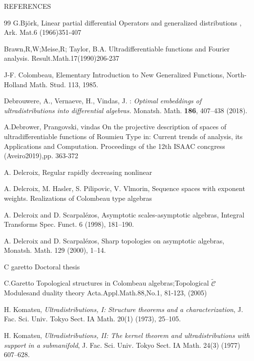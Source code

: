 \documentclass[12pt,a4paper]{amsart}
\begin{document}
REFERENCES %
\begin{thebibliography}{99}
 G.Bj\"{o}rk, Linear partial differential Operators and generalized distributions , Ark. Mat.6 (1966)351-407 
  
  
  
  
  
Brawn,R,W;Meise,R; Taylor, B.A.
Ultradifferentiable functions and Fourier analysis.
Result.Math.17(1990)206-237

J-F. Colombeau,
 Elementary Introduction to New Generalized Functions,
North-Holland Math. Stud. 113, 1985.

Debrouwere, A., Vernaeve, H., Vindas, J. :
\emph{Optimal embeddings of ultradistributions into differential algebras.}
Monatsh.  Math.  \textbf{186}, 407–438 (2018).

A.Debrower, Prangovski, vindas
On the projective description of spaces of ultradifferentiable functions of Roumieu Type in:
Current trends of analysis, its Applications and Computation. Proceedings of the 12th ISAAC concgress (Aveiro2019),pp. 363-372

 A. Delcroix, Regular rapidly decreasing nonlinear %


 A. Delcroix, M. Hasler,  S. Pilipovic, V. Vlmorin, Sequence spaces with exponent weights. Realizations of Colombeau type algebras

 A. Delcroix and D. Scarpal\'ezos, Asymptotic scales-asymptotic algebras, Integral Transforms Spec. Funct. 6 (1998), 181–190.



 A. Delcroix and D. Scarpal\'ezos, Sharp topologies on asymptotic algebras, Monatsh. Math. 129 (2000), 1–14.



 C garetto
Doctoral thesis 

 C.Garetto 
Topological structures in Colombeau algebras;Topological
 $\widetilde{\mathcal{C}}$Modulesand duality theory
 Acta.Appl.Math.88,No.1,  81-123, (2005)


 H. Komatsu, \textit{Ultradistributions, I: Structure theorems and a characterization}, J. Fac. Sci. Univ. Tokyo Sect. IA Math. 20(1) (1973), 25--105.

 H. Komatsu, \textit{Ultradistributions, II: The kernel theorem and ultradistributions with support in a submanifold}, J. Fac. Sci. Univ. Tokyo Sect. IA Math. 24(3) (1977) 607--628.


\end{thebibliography}
\end{document}
